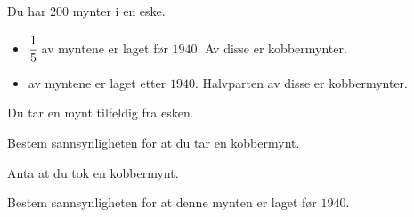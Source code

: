 
\Oppgave[4] %

Du har $200$ mynter i en eske.

\begin{itemize}
  \item $\cfrac{1}{5}$ av myntene er laget før $1940$. Av disse er
    kobbermynter.
  \item av myntene er laget etter $1940$. Halvparten av disse er kobbermynter.
\end{itemize}

Du tar en mynt tilfeldig fra esken.

\begin{oppgaver}
   Bestem sannsynligheten for at du tar en kobbermynt.
\end{oppgaver}

Anta at du tok en kobbermynt.

\begin{oppgaver}
   Bestem sannsynligheten for at denne mynten er laget før $1940$.
\end{oppgaver}


\Oppgave[4] %

\begin{figure}[H]
  \caption{}
  \label{fig:del-2-oppgave-4}
\end{figure}

